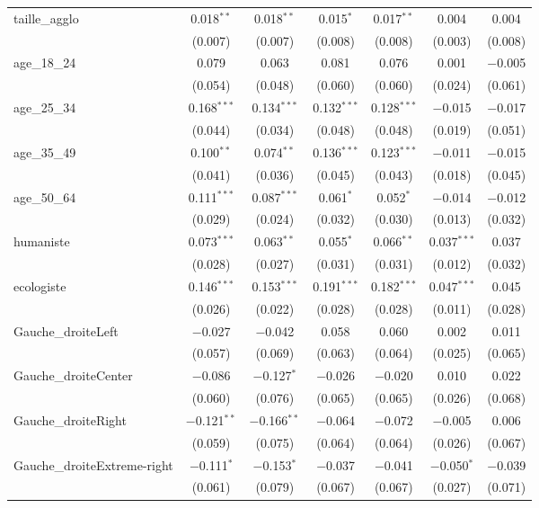 \documentclass[11pt]{article}
\begin{document}
\begin{table}[!htbp]
{\begin{tabular}{@{\extracolsep{5pt}}lcccccc}
  taille\_agglo & 0.018$^{**}$ & 0.018$^{**}$ & 0.015$^{*}$ & 0.017$^{**}$ & 0.004 & 0.004 \\ 
  & (0.007) & (0.007) & (0.008) & (0.008) & (0.003) & (0.008) \\ 
  age\_18\_24 & 0.079 & 0.063 & 0.081 & 0.076 & 0.001 & $-$0.005 \\ 
  & (0.054) & (0.048) & (0.060) & (0.060) & (0.024) & (0.061) \\ 
  age\_25\_34 & 0.168$^{***}$ & 0.134$^{***}$ & 0.132$^{***}$ & 0.128$^{***}$ & $-$0.015 & $-$0.017 \\ 
  & (0.044) & (0.034) & (0.048) & (0.048) & (0.019) & (0.051) \\ 
  age\_35\_49 & 0.100$^{**}$ & 0.074$^{**}$ & 0.136$^{***}$ & 0.123$^{***}$ & $-$0.011 & $-$0.015 \\ 
  & (0.041) & (0.036) & (0.045) & (0.043) & (0.018) & (0.045) \\ 
  age\_50\_64 & 0.111$^{***}$ & 0.087$^{***}$ & 0.061$^{*}$ & 0.052$^{*}$ & $-$0.014 & $-$0.012 \\ 
  & (0.029) & (0.024) & (0.032) & (0.030) & (0.013) & (0.032) \\ 
  humaniste & 0.073$^{***}$ & 0.063$^{**}$ & 0.055$^{*}$ & 0.066$^{**}$ & 0.037$^{***}$ & 0.037 \\ 
  & (0.028) & (0.027) & (0.031) & (0.031) & (0.012) & (0.032) \\ 
  ecologiste & 0.146$^{***}$ & 0.153$^{***}$ & 0.191$^{***}$ & 0.182$^{***}$ & 0.047$^{***}$ & 0.045 \\ 
  & (0.026) & (0.022) & (0.028) & (0.028) & (0.011) & (0.028) \\ 
  Gauche\_droiteLeft & $-$0.027 & $-$0.042 & 0.058 & 0.060 & 0.002 & 0.011 \\ 
  & (0.057) & (0.069) & (0.063) & (0.064) & (0.025) & (0.065) \\ 
  Gauche\_droiteCenter & $-$0.086 & $-$0.127$^{*}$ & $-$0.026 & $-$0.020 & 0.010 & 0.022 \\ 
  & (0.060) & (0.076) & (0.065) & (0.065) & (0.026) & (0.068) \\ 
  Gauche\_droiteRight & $-$0.121$^{**}$ & $-$0.166$^{**}$ & $-$0.064 & $-$0.072 & $-$0.005 & 0.006 \\ 
  & (0.059) & (0.075) & (0.064) & (0.064) & (0.026) & (0.067) \\ 
  Gauche\_droiteExtreme-right & $-$0.111$^{*}$ & $-$0.153$^{*}$ & $-$0.037 & $-$0.041 & $-$0.050$^{*}$ & $-$0.039 \\ 
  & (0.061) & (0.079) & (0.067) & (0.067) & (0.027) & (0.071) \\ 

\end{tabular}}
\end{table}
\end{document}
